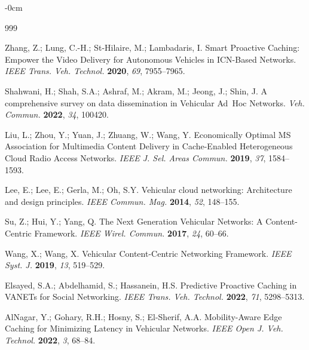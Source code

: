 \documentclass[electronics,aricle,accept,pdftex,moreauthors]{Definitions/mdpi}
\begin{document}
\begin{adjustwidth}{-\extralength}{0cm}
 \begin{thebibliography}{999}



 Zhang, Z.; Lung, C.-H.; St-Hilaire, M.; Lambadaris, I. Smart Proactive Caching: Empower the Video Delivery for Autonomous Vehicles in ICN-Based Networks. \textit{IEEE Trans. Veh. Technol.} \textbf{2020}, \emph{69}, 7955--7965.

 Shahwani, H.; Shah, S.A.; Ashraf, M.; Akram, M.; Jeong, J.; Shin, J. A comprehensive survey on data dissemination in Vehicular Ad~Hoc Networks. \textit{Veh. Commun.} \textbf{2022}, \emph{34}, 100420.

 Liu, L.; Zhou, Y.; Yuan, J.; Zhuang, W.; Wang, Y. Economically Optimal MS Association for Multimedia Content Delivery in Cache-Enabled Heterogeneous Cloud Radio Access Networks. \textit{IEEE J. Sel. Areas Commun.} \textbf{2019}, \emph{37}, 1584--1593.

 Lee, E.; Lee, E.; Gerla, M.; Oh, S.Y. Vehicular cloud networking: Architecture and design principles. \textit{IEEE Commun. Mag.} \textbf{2014}, \emph{52}, 148--155.

 Su, Z.; Hui, Y.; Yang, Q. The Next Generation Vehicular Networks: A Content-Centric Framework. \textit{IEEE Wirel. Commun.} \textbf{2017}, \emph{24}, 60--66.

 Wang, X.; Wang, X. Vehicular Content-Centric Networking Framework. \textit{IEEE Syst. J.} \textbf{2019}, \emph{13}, 519--529.

 Elsayed, S.A.; Abdelhamid, S.; Hassanein, H.S. Predictive Proactive Caching in VANETs for Social Networking. \textit{IEEE Trans. Veh. Technol.} \textbf{2022}, \emph{71}, 5298--5313.

 AlNagar, Y.; Gohary, R.H.; Hosny, S.; El-Sherif, A.A. Mobility-Aware Edge Caching for Minimizing Latency in Vehicular Networks. \textit{IEEE Open J. Veh. Technol.} \textbf{2022}, \emph{3}, 68--84.


\end{thebibliography}
\end{adjustwidth}
\end{document}
